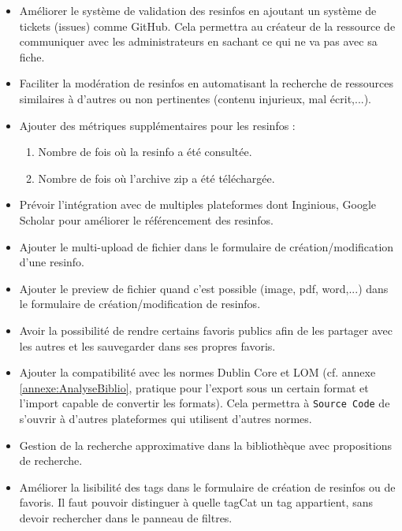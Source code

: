 \begin{itemize}
    \item Améliorer le système de validation des \glspl{resinfo} en ajoutant un système de tickets (issues) comme GitHub. Cela permettra au créateur de la ressource de communiquer avec les administrateurs en sachant ce qui ne va pas avec sa \gls{fiche}.
    \item Faciliter la modération de \glspl{resinfo} en automatisant la recherche de ressources similaires à d'autres ou non pertinentes (contenu injurieux, mal écrit,...).
    \item Ajouter des métriques supplémentaires pour les \glspl{resinfo} :
    \begin{enumerate}
        \item Nombre de fois où la \gls{resinfo} a été consultée.
        \item Nombre de fois où l'archive zip a été téléchargée.
    \end{enumerate}
    \item Prévoir l'intégration avec de multiples plateformes dont Inginious, Google Scholar pour améliorer le référencement des \glspl{resinfo}.
    \item Ajouter le multi-upload de fichier dans le formulaire de création/modification d'une \gls{resinfo}.
    \item Ajouter le preview de fichier quand c'est possible (image, pdf, word,...) dans le formulaire de création/modification de \glspl{resinfo}.
    \item Avoir la possibilité de rendre certains favoris publics afin de les partager avec les autres et les sauvegarder dans ses propres favoris.
    \item Ajouter la compatibilité avec les normes Dublin Core et LOM (cf. annexe \ref{annexe:AnalyseBiblio}, pratique pour l'export sous un certain format et l'import capable de convertir les formats). Cela permettra à \texttt{Source Code} de s'ouvrir à d'autres plateformes qui utilisent d'autres normes.
    \item Gestion de la recherche approximative dans la bibliothèque avec propositions de recherche.
    \item Améliorer la lisibilité des \glspl{tag} dans le formulaire de création de \glspl{resinfo} ou de favoris. Il faut pouvoir distinguer à quelle \gls{tagCat} un \gls{tag} appartient, sans devoir rechercher dans le panneau de filtres.

\end{itemize}
